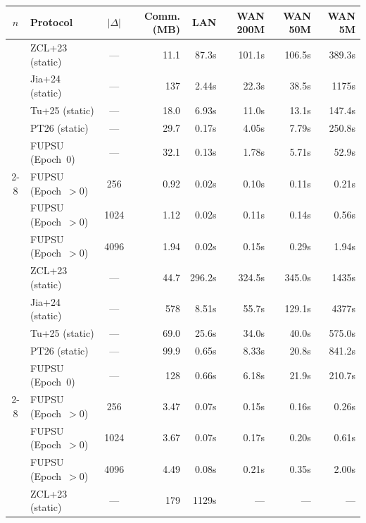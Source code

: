 \begin{table}[ht]
\centering
\footnotesize
\begin{tabular}{|c|l|c|r|r|r|r|r|}
\hline
$n$ & \textbf{Protocol} & $|\Delta|$ & \textbf{Comm. (MB)} &
\textbf{LAN} & \textbf{WAN 200M} & \textbf{WAN 50M} & \textbf{WAN 5M} \\
\hline\noalign{\vspace{-1pt}}\hline
\multirow{8}{*}{$2^{16}$}
& ZCL+23 (static)    & --- & 11.1  & 87.3s  & 101.1s & 106.5s & 389.3s \\
& Jia+24 (static)    & --- & 137   & 2.44s  & 22.3s  & 38.5s  & 1175s \\
& Tu+25 (static)     & --- & 18.0  & 6.93s  & 11.0s  & 13.1s  & 147.4s \\
& PT26 (static)      & --- & 29.7  & 0.17s  & 4.05s  & 7.79s  & 250.8s \\
& FUPSU (Epoch~0)    & --- & 32.1  & 0.13s  & 1.78s  & 5.71s  & 52.9s \\
\cline{2-8}
& FUPSU (Epoch~$>$0) & 256  & 0.92  & 0.02s  & 0.10s  & 0.11s  & 0.21s \\
& FUPSU (Epoch~$>$0) & 1024 & 1.12  & 0.02s  & 0.11s  & 0.14s  & 0.56s \\
& FUPSU (Epoch~$>$0) & 4096 & 1.94  & 0.02s  & 0.15s  & 0.29s  & 1.94s \\
\hline\noalign{\vspace{-1pt}}\hline
\multirow{8}{*}{$2^{18}$}
& ZCL+23 (static)    & --- & 44.7  & 296.2s & 324.5s & 345.0s & 1435s \\
& Jia+24 (static)    & --- & 578   & 8.51s  & 55.7s  & 129.1s & 4377s \\
& Tu+25 (static)     & --- & 69.0  & 25.6s  & 34.0s  & 40.0s  & 575.0s \\
& PT26 (static)      & --- & 99.9  & 0.65s  & 8.33s  & 20.8s  & 841.2s \\
& FUPSU (Epoch~0)    & --- & 128   & 0.66s  & 6.18s  & 21.9s  & 210.7s \\
\cline{2-8}
& FUPSU (Epoch~$>$0) & 256  & 3.47  & 0.07s  & 0.15s  & 0.16s  & 0.26s \\
& FUPSU (Epoch~$>$0) & 1024 & 3.67  & 0.07s  & 0.17s  & 0.20s  & 0.61s \\
& FUPSU (Epoch~$>$0) & 4096 & 4.49  & 0.08s  & 0.21s  & 0.35s  & 2.00s \\
\hline\noalign{\vspace{-1pt}}\hline
\multirow{8}{*}{$2^{20}$}
& ZCL+23 (static)    & --- & 179   & 1129s  & ---    & ---    & --- \\

\end{tabular}
\end{table}

